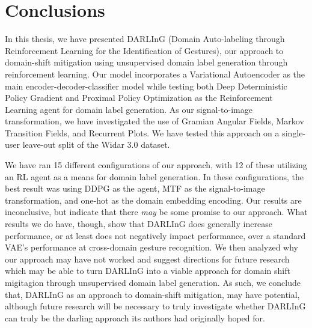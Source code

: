 \chapter{Conclusions}\label{chapter:conclusions}

In this thesis, we have presented DARLInG (Domain Auto-labeling through Reinforcement Learning for the Identification of Gestures), our approach to domain-shift mitigation using unsupervised domain label generation through reinforcement learning.
Our model incorporates a Variational Autoencoder as the main encoder-decoder-classifier model while testing both Deep Deterministic Policy Gradient and Proximal Policy Optimization as the Reinforcement Learning agent for domain label generation.
As our signal-to-image transformation, we have investigated the use of Gramian Angular Fields, Markov Transition Fields, and Recurrent Plots.
We have tested this approach on a single-user leave-out split of the Widar 3.0 \cite{zheng2019zero} dataset.

We have ran 15 different configurations of our approach, with 12 of these utilizing an RL agent as a means for domain label generation.
In these configurations, the best result was using DDPG as the agent, MTF as the signal-to-image transformation, and one-hot as the domain embedding encoding.
Our results are inconclusive, but indicate that there \textit{may} be some promise to our approach.
What results we do have, though, show that DARLInG does generally increase performance, or at least does not negatively impact performance, over a standard VAE's performance at cross-domain gesture recognition.
We then analyzed why our approach may have not worked and suggest directions for future research which may be able to turn DARLInG into a viable approach for domain shift migitagion through unsupervised domain label generation.
As such, we conclude that, DARLInG as an approach to domain-shift mitigation, may have potential, although future research will be necessary to truly investigate whether DARLInG can truly be the darling approach its authors had originally hoped for.